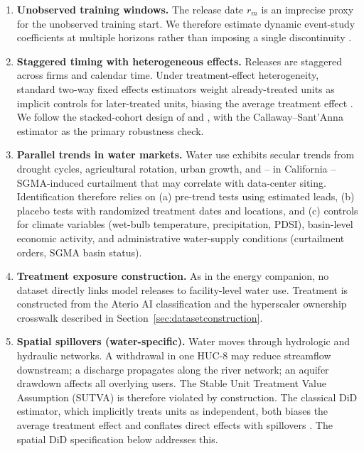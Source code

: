 \documentclass[11pt, letterpaper]{article}
\begin{document}
\begin{enumerate}
\item \textbf{Unobserved training windows.} The release date $r_m$ is an imprecise proxy for the unobserved training start. We therefore estimate dynamic event-study coefficients at multiple horizons rather than imposing a single discontinuity \citep{cengiz2019effect,deshpande2019screened}.

\item \textbf{Staggered timing with heterogeneous effects.} Releases are staggered across firms and calendar time. Under treatment-effect heterogeneity, standard two-way fixed effects estimators weight already-treated units as implicit controls for later-treated units, biasing the average treatment effect \citep{goodman2021difference,sun2021treatment,callaway2021difference,borusyak2024revisiting}. We follow the stacked-cohort design of \citet{cengiz2019effect} and \citet{wing2024stacked}, with the Callaway--Sant'Anna estimator \citep{callaway2021difference} as the primary robustness check.

\item \textbf{Parallel trends in water markets.} Water use exhibits secular trends from drought cycles, agricultural rotation, urban growth, and -- in California -- SGMA-induced curtailment that may correlate with data-center siting. Identification therefore relies on (a) pre-trend tests using estimated leads, (b) placebo tests with randomized treatment dates and locations, and (c) controls for climate variables (wet-bulb temperature, precipitation, PDSI), basin-level economic activity, and administrative water-supply conditions (curtailment orders, SGMA basin status).

\item \textbf{Treatment exposure construction.} As in the energy companion, no dataset directly links model releases to facility-level water use. Treatment is constructed from the Aterio AI classification and the hyperscaler ownership crosswalk described in Section~\ref{sec:datasetconstruction}.

\item \textbf{Spatial spillovers (water-specific).} Water moves through hydrologic and hydraulic networks. A withdrawal in one HUC-8 may reduce streamflow downstream; a discharge propagates along the river network; an aquifer drawdown affects all overlying users. The Stable Unit Treatment Value Assumption (SUTVA) is therefore violated by construction. The classical DiD estimator, which implicitly treats units as independent, both biases the average treatment effect and conflates direct effects with spillovers \citep{butts2023did,delgado2015did}. The spatial DiD specification below addresses this.
\end{enumerate}
\end{document}
